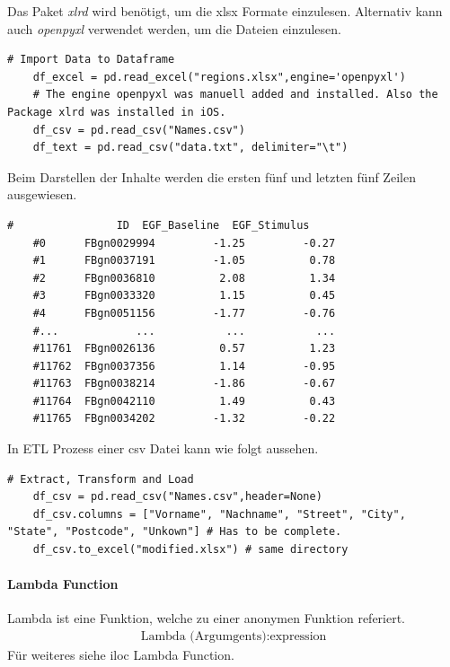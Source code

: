 Das Paket \textit{xlrd} wird benötigt, um die \gls{xlsx} Formate einzulesen. Alternativ kann auch \textit{openpyxl} verwendet werden, um die Dateien einzulesen.
\begin{lstlisting}[style=python]
	# Import Data to Dataframe
	df_excel = pd.read_excel("regions.xlsx",engine='openpyxl')
	# The engine openpyxl was manuell added and installed. Also the Package xlrd was installed in iOS.
	df_csv = pd.read_csv("Names.csv")
	df_text = pd.read_csv("data.txt", delimiter="\t")
\end{lstlisting}

Beim Darstellen der Inhalte werden die ersten fünf und letzten fünf Zeilen ausgewiesen.
\begin{lstlisting}[style=python]
	#                ID  EGF_Baseline  EGF_Stimulus
	#0      FBgn0029994         -1.25         -0.27
	#1      FBgn0037191         -1.05          0.78
	#2      FBgn0036810          2.08          1.34
	#3      FBgn0033320          1.15          0.45
	#4      FBgn0051156         -1.77         -0.76
	#...            ...           ...           ...
	#11761  FBgn0026136          0.57          1.23
	#11762  FBgn0037356          1.14         -0.95
	#11763  FBgn0038214         -1.86         -0.67
	#11764  FBgn0042110          1.49          0.43
	#11765  FBgn0034202         -1.32         -0.22
\end{lstlisting}

In \gls{ETL} Prozess einer \gls{csv} Datei kann wie folgt aussehen.
\begin{lstlisting}[style=python]
	# Extract, Transform and Load
	df_csv = pd.read_csv("Names.csv",header=None)
	df_csv.columns = ["Vorname", "Nachname", "Street", "City", "State", "Postcode", "Unkown"] # Has to be complete.
	df_csv.to_excel("modified.xlsx") # same directory
\end{lstlisting}

\paragraph*{Lambda Function}
Lambda ist eine Funktion, welche zu einer anonymen Funktion referiert.
\begin{align}
	\text{Lambda (Argumgents)}:\text{expression}
\end{align}
Für weiteres siehe iloc Lambda Function. 

